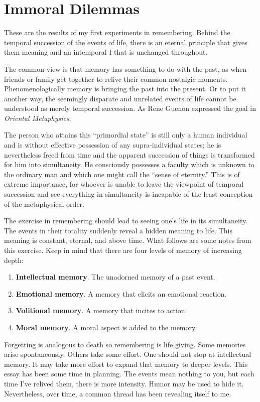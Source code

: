\section{Immoral Dilemmas}

These are the results of my first experiments in remembering. Behind the temporal succession of the events of life, there is an eternal principle that gives them meaning and an intemporal I that is unchanged throughout.

The common view is that memory has something to do with the past, as when friends or family get together to relive their common nostalgic moments. Phenomenologically memory is bringing the past into the present. Or to put it another way, the seemingly disparate and unrelated events of life cannot be understood as merely temporal succession. As Rene Guenon expressed the goal in \emph{Oriental Metaphysics}:

\begin{quotex}
The person who attains this “primordial state” is still only a human individual and is without effective possession of any supra-individual states; he is nevertheless freed from time and the apparent succession of things is transformed for him into simultaneity. He consciously possesses a faculty which is unknown to the ordinary man and which one might call the “sense of eternity.” This is of extreme importance, for whoever is unable to leave the viewpoint of temporal succession and see everything in simultaneity is incapable of the least conception of the metaphysical order.

\end{quotex}
The exercise in remembering should lead to seeing one's life in its simultaneity. The events in their totality suddenly reveal a hidden meaning to life. This meaning is constant, eternal, and above time. What follows are some notes from this exercise. Keep in mind that there are four levels of memory of increasing depth:

\begin{enumerate}
\item \textbf{Intellectual memory}. The unadorned memory of a past event. 
\item \textbf{Emotional memory}. A memory that elicits an emotional reaction. 
\item \textbf{Volitional memory}. A memory that incites to action. 
\item \textbf{Moral memory}. A moral aspect is added to the memory. 
\end{enumerate}
Forgetting is analogous to death so remembering is life giving. Some memories arise spontaneously. Others take some effort. One should not stop at intellectual memory. It may take more effort to expand that memory to deeper levels. This essay has been some time in planning. The events mean nothing to you, but each time I've relived them, there is more intensity. Humor may be used to hide it. Nevertheless, over time, a common thread has been revealing itself to me.

